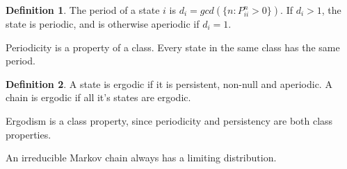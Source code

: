 \documentclass[12pt,letterpaper]{amsbook}
\theoremstyle{definition}
\newtheorem{definition}{Definition}%
\begin{document}
\begin{definition}
  The period of a state $i$ is $d_i = gcd(\{n : P_{ii}^n > 0\})$. If $d_i > 1$, the state is periodic, and is otherwise aperiodic if $d_i=1$.
\end{definition}

Periodicity is a property of a class. Every state in the same class has the same period.

\begin{definition}
  A state is ergodic if it is persistent, non-null and aperiodic. A chain is ergodic if all it's states are ergodic. 
\end{definition}

Ergodism is a class property, since periodicity and persistency are both class properties.

\begin{theorem}
  An irreducible Markov chain always has a limiting distribution. 
\end{theorem}
\end{document}
